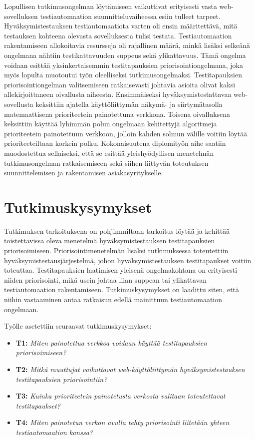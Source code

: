   Lopullisen tutkimusongelman löytämiseen vaikuttivat erityisesti vasta web-sovelluksen testiautomaation suunnitteluvaiheessa esiin tulleet tarpeet.
  Hyväksymistestauksen testiautomaatiota varten oli ensin määritettävä, mitä testauksen kohteena olevasta sovelluksesta tulisi testata.
  Testiautomaation rakentamiseen allokoitavia resursseja oli rajallinen määrä, minkä lisäksi selkeänä ongelmana nähtiin testikattavuuden suppeus sekä ylikattavuus.
  Tämä ongelma voidaan esittää yksinkertaisemmin testitapauksien priorisointiongelmana, joka myös lopulta muotoutui työn oleelliseksi tutkimusongelmaksi.
  Testitapauksien priorisointiongelman valitsemiseen ratkaisevasti johtavia asioita olivat kaksi allekirjoittaneen oivallusta aiheesta.
  Ensimmäiseksi hyväksymistestattavaa web-sovellusta keksittiin ajatella käyttöliittymän näkymä- ja siirtymätasolla matemaattisena prioriteetein painotettuna verkkona.
  Toisena oivalluksena keksittiin käyttää lyhimmän polun ongelmaan kehitettyjä algoritmeja prioriteetein painotettuun verkkoon, jolloin kahden solmun välille voitiin löytää prioriteeteiltaan korkein polku.
  Kokonaisuutena diplomityön aihe saatiin muodostettua sellaiseksi, että se esittää yleishyödyllisen menetelmän tutkimusongelman ratkaisemiseen sekä siihen liittyvän toteutuksen suunnittelemisen ja rakentamisen asiakasyritykselle.

\section{Tutkimuskysymykset} \label{ch:06_tutkimuskysymykset}

  Tutkimuksen tarkoituksena on pohjimmiltaan tarkoitus löytää ja kehittää toistettavissa oleva menetelmä hyväksymistestauksen testitapauksien priorisoimiseen.
  Priorisointimenetelmän lisäksi tutkimuksessa toteutettiin hyväksymistestausjärjestelmä, johon hyväksymistestauksen testitapaukset voitiin toteuttaa.
  Testitapauksien laatimisen yleisenä ongelmakohtana on erityisesti niiden priorisointi, mikä usein johtaa liian suppean tai ylikattavan testiautomaation rakentamiseen.
  Tutkimuskysymykset on laadittu siten, että niihin vastaaminen antaa ratkaisun edellä mainittuun testiautomaation ongelmaan.

  Työlle asetettiin seuraavat tutkimuskysymykset:

  \begin{itemize}
    \item \textbf{T1:} \emph{Miten painotettua verkkoa voidaan käyttää testitapauksien priorisoimiseen?}
    \item \textbf{T2:} \emph{Mitkä muuttujat vaikuttavat web-käyttöliittymän hyväksymistestauksen testitapauksien priorisointiin?}
    \item \textbf{T3:} \emph{Kuinka prioriteetein painotetusta verkosta valitaan toteutettavat testitapaukset?}
    \item \textbf{T4:} \emph{Miten painotetun verkon avulla tehty priorisointi liitetään yhteen testiautomaation kanssa?}
  \end{itemize}

